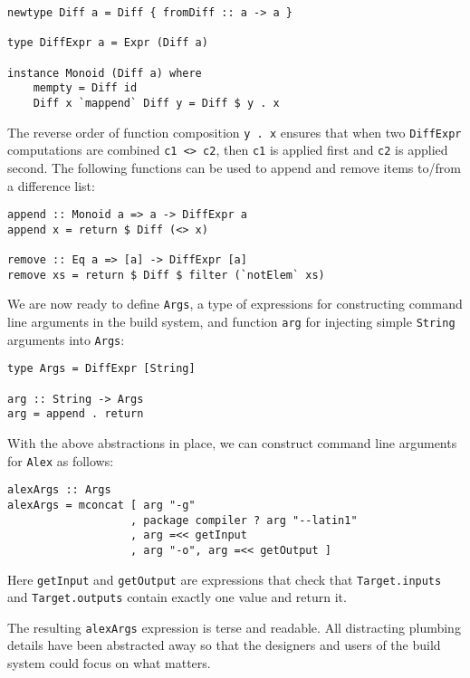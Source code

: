 \begin{lstlisting}[basicstyle=\ttfamily]
newtype Diff a = Diff { fromDiff :: a -> a }

type DiffExpr a = Expr (Diff a)

instance Monoid (Diff a) where
    mempty = Diff id
    Diff x `mappend` Diff y = Diff $ y . x
\end{lstlisting}

The reverse order of function composition \texttt{y . x} ensures that when two
\texttt{DiffExpr} computations are combined \texttt{c1 <> c2}, then \texttt{c1}
is applied first and \texttt{c2} is applied second. The following functions
can be used to append and remove items to/from a difference list:

\begin{lstlisting}[basicstyle=\ttfamily]
append :: Monoid a => a -> DiffExpr a
append x = return $ Diff (<> x)

remove :: Eq a => [a] -> DiffExpr [a]
remove xs = return $ Diff $ filter (`notElem` xs)
\end{lstlisting}

We are now ready to define \texttt{Args}, a type of expressions for constructing
command line arguments in the build system, and function \texttt{arg} for
injecting simple \texttt{String} arguments into \texttt{Args}:

\begin{lstlisting}[basicstyle=\ttfamily]
type Args = DiffExpr [String]

arg :: String -> Args
arg = append . return
\end{lstlisting}

With the above abstractions in place, we can construct command line arguments
for \texttt{Alex} as follows:

\begin{lstlisting}[basicstyle=\ttfamily]
alexArgs :: Args
alexArgs = mconcat [ arg "-g"
                   , package compiler ? arg "--latin1" 
                   , arg =<< getInput
                   , arg "-o", arg =<< getOutput ]
\end{lstlisting}

Here \texttt{getInput} and \texttt{getOutput} are expressions that check that
\texttt{Target.inputs} and \texttt{Target.outputs} contain exactly one value and
return it.

The resulting \texttt{alexArgs} expression is terse and readable. All
distracting plumbing details have been abstracted away so that the
designers and users of the build system could focus on what matters.


